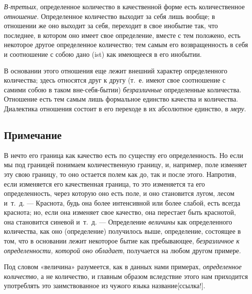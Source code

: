 {\em В-третьих}, определенное количество в качественной
форме есть количественное {\em отношение}. Определенное
количество выходит за себя лишь вообще; в отношении же оно выходит за себя,
переходит в свое инобытие так, что последнее, в котором оно имеет свое
определение, вместе с тем положено, есть некоторое другое определенное
количество; тем самым его возвращенность в себя и соотношение с собою дано
(ist) как имеющееся в его инобытии.

В основании этого отношения еще лежит внешний характер определенного
количества; здесь относятся друг к другу (т.~е. имеют свое соотношение с
самими собою в таком вне-себя-бытии) {\em безразличные}
определенные количества. Отношение есть тем самым лишь формальное единство
качества и количества. Диалектика отношения состоит в его переходе в их
абсолютное единство, в {\em меру}.

\subsection*{Примечание}

В нечто его граница как качество есть по существу его определенность. Но
если мы под границей понимаем количественную границу, и, например, поле
изменяет эту свою границу, то оно остается полем как до, так и после этого.
Напротив, если изменяется его качественная граница, то это изменяется та
его определенность, через которую оно есть поле, и оно становится лугом,
лесом и~т.~д. — Краснота, будь она более интенсивной или более слабой, есть
всегда краснота; но, если она изменяет свое качество, она перестает быть
краснотой, она становится синевой и~т.~д. — Определение
{\em величины} как определенного количества, как оно
(определение) получилось выше, определение, состоящее в том, что в
основании лежит некоторое бытие как пребывающее,
{\em безразличное к определенности, которой оно
обладает}, получается на любом другом примере.

Под словом «величина» разумеется, как в данных нами примерах,
{\em определенное количество}, а не количество, и
главным образом вследствие этого нам приходится употреблять это
заимствованное из чужого языка
название[ссылка!].

